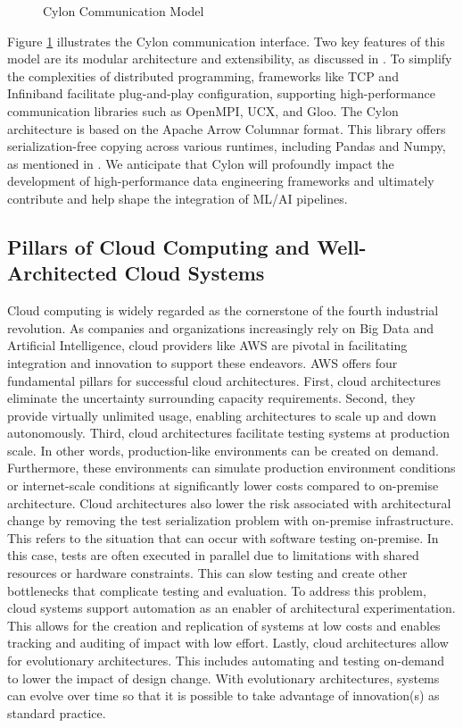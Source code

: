\begin{figure}[H]
    \centering
    
    \caption{Cylon Communication Model}
    \label{fig:cyloncomm}
\end{figure}

Figure \ref{fig:cyloncomm} illustrates the Cylon communication interface. Two key features of this model are its modular architecture and extensibility, as discussed in \cite{pererathesis}. To simplify the complexities of distributed programming, frameworks like TCP and Infiniband facilitate plug-and-play configuration, supporting high-performance communication libraries such as OpenMPI, UCX, and Gloo. The Cylon architecture is based on the Apache Arrow Columnar format. This library offers serialization-free copying across various runtimes, including Pandas and Numpy, as mentioned in \cite{pererathesis}. We anticipate that Cylon will profoundly impact the development of high-performance data engineering frameworks and ultimately contribute and help shape the integration of ML/AI pipelines. 

\subsection{Pillars of Cloud Computing and Well-Architected Cloud Systems}
Cloud computing is widely regarded as the cornerstone of the fourth industrial revolution. As companies and organizations increasingly rely on Big Data and Artificial Intelligence, cloud providers like AWS are pivotal in facilitating integration and innovation to support these endeavors. \cite{hashemipour2020amazon} AWS offers four fundamental pillars for successful cloud architectures. First, cloud architectures eliminate the uncertainty surrounding capacity requirements. Second, they provide virtually unlimited usage, enabling architectures to scale up and down autonomously. Third, cloud architectures facilitate testing systems at production scale. In other words, production-like environments can be created on demand.
Furthermore, these environments can simulate production environment conditions or internet-scale conditions at significantly lower costs compared to on-premise architecture. Cloud architectures also lower the risk associated with architectural change by removing the test serialization problem with on-premise infrastructure.  This refers to the situation that can occur with software testing on-premise.  In this case, tests are often executed in parallel due to limitations with shared resources or hardware constraints.  This can slow testing and create other bottlenecks that complicate testing and evaluation.  To address this problem, cloud systems support automation as an enabler of architectural experimentation. This allows for the creation and replication of systems at low costs and enables tracking and auditing of impact with low effort.  Lastly, cloud architectures allow for evolutionary architectures.  This includes automating and testing on-demand to lower the impact of design change.  With evolutionary architectures, systems can evolve over time so that it is possible to take advantage of innovation(s) as standard practice\cite{aws_well_architected_framework}.

